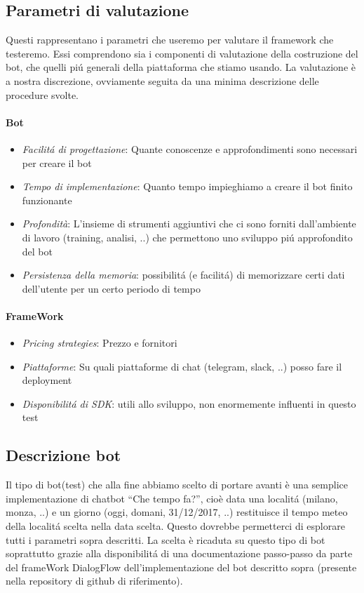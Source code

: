 \documentclass[]{article}
\begin{document}
\subsection{Parametri di valutazione}
Questi rappresentano i parametri che useremo per valutare il framework che testeremo. Essi comprendono sia i componenti di valutazione della costruzione del bot, che quelli piú generali della piattaforma che stiamo usando. La valutazione è a nostra discrezione, ovviamente seguita da una minima descrizione delle procedure svolte.

\paragraph{Bot}
\begin{itemize}
\item \textit{Facilitá di progettazione}: Quante conoscenze e approfondimenti sono necessari per creare il bot
\item \textit{Tempo di implementazione}: Quanto tempo impieghiamo a creare il bot finito funzionante
\item \textit{Profondità}: L’insieme di strumenti aggiuntivi che ci sono forniti dall’ambiente di lavoro (training, analisi, ..) che permettono uno sviluppo piú approfondito del bot
\item \textit{Persistenza della memoria}: possibilitá (e facilitá) di memorizzare certi dati dell’utente per un certo periodo di tempo
\end{itemize}

\paragraph{FrameWork}
\begin{itemize}
\item \textit{Pricing strategies}: Prezzo e fornitori
\item \textit{Piattaforme}: Su quali piattaforme di chat (telegram, slack, ..) posso fare il deployment
\item \textit{Disponibilitá di SDK}: utili allo sviluppo, non enormemente influenti in questo test
\end{itemize}

\subsection{Descrizione bot}
Il tipo di bot(test) che alla fine abbiamo scelto di portare avanti è una semplice implementazione di chatbot “Che tempo fa?”, cioè data una localitá (milano, monza, ..) e un giorno (oggi, domani, 31/12/2017, ..) restituisce il tempo meteo della localitá scelta nella data scelta. Questo dovrebbe permetterci di esplorare tutti i parametri sopra descritti.
La scelta è ricaduta su questo tipo di bot soprattutto grazie alla disponibilitá di una documentazione passo-passo da parte del frameWork DialogFlow dell'implementazione del bot descritto sopra (presente nella repository di github di riferimento).
\end{document}
